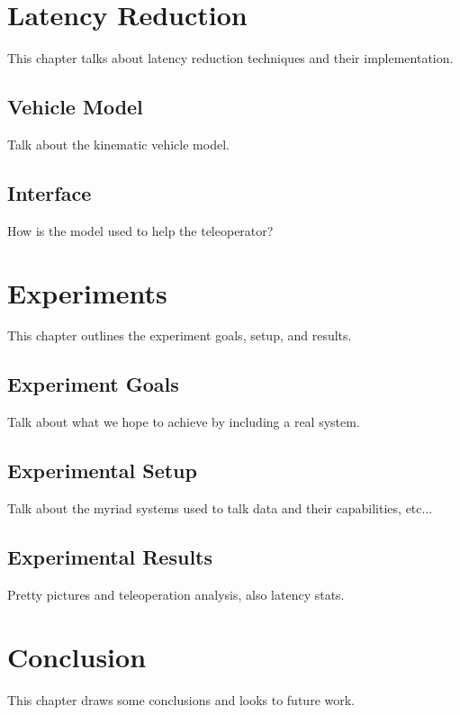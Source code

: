 \documentclass[12pt]{report}
\begin{document}

\chapter{Latency Reduction}\label{chap:latency_reduction}
This chapter talks about latency reduction techniques and their implementation.

\section{Vehicle Model}
Talk about the kinematic vehicle model.

\section{Interface}
How is the model used to help the teleoperator?


\chapter{Experiments}\label{chap:experiments}
This chapter outlines the experiment goals, setup, and results.

\section{Experiment Goals}
Talk about what we hope to achieve by including a real system.

\section{Experimental Setup}\label{sec:experimental_setup}
Talk about the myriad systems used to talk data and their capabilities, etc...

\section{Experimental Results}
Pretty pictures and teleoperation analysis, also latency stats.


\chapter{Conclusion}\label{chap:conclusion}
This chapter draws some conclusions and looks to future work.
\end{document}
